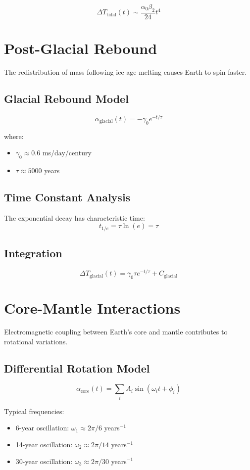 \documentclass[12pt,a4paper]{report}
\begin{document}
\[
\Delta T_{\text{tidal}}(t) \sim \frac{\alpha_0 \beta_2}{24} t^4
\]

\section{Post-Glacial Rebound}

The redistribution of mass following ice age melting causes Earth to spin faster.

\subsection{Glacial Rebound Model}

\[
\alpha_{\text{glacial}}(t) = -\gamma_0 e^{-t/\tau}
\]

where:
\begin{itemize}
\item $\gamma_0 \approx 0.6$ ms/day/century
\item $\tau \approx 5000$ years
\end{itemize}

\subsection{Time Constant Analysis}

The exponential decay has characteristic time:
\[
t_{1/e} = \tau \ln(e) = \tau
\]

\subsection{Integration}

\[
\Delta T_{\text{glacial}}(t) = \gamma_0 \tau e^{-t/\tau} + C_{\text{glacial}}
\]

\section{Core-Mantle Interactions}

Electromagnetic coupling between Earth's core and mantle contributes to rotational variations.

\subsection{Differential Rotation Model}

\[
\alpha_{\text{core}}(t) = \sum_{i} A_i \sin(\omega_i t + \phi_i)
\]

Typical frequencies:
\begin{itemize}
\item 6-year oscillation: $\omega_1 \approx 2\pi/6$ years$^{-1}$
\item 14-year oscillation: $\omega_2 \approx 2\pi/14$ years$^{-1}$
\item 30-year oscillation: $\omega_3 \approx 2\pi/30$ years$^{-1}$
\end{itemize}
\end{document}
